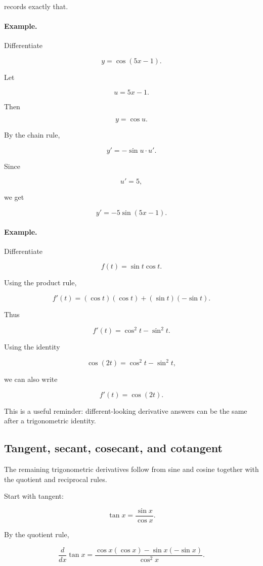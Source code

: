 records exactly that.

\paragraph{Example.}
Differentiate

\[
y=\cos(5x-1).
\]

Let

\[
u=5x-1.
\]

Then

\[
y=\cos u.
\]

By the chain rule,

\[
y'=-\sin u\cdot u'.
\]

Since

\[
u'=5,
\]

we get

\[
\boxed{
y'=-5\sin(5x-1).
}
\]

\paragraph{Example.}
Differentiate

\[
f(t)=\sin t\cos t.
\]

Using the product rule,

\[
f'(t)
=
(\cos t)(\cos t)+(\sin t)(-\sin t).
\]

Thus

\[
f'(t)=\cos^2 t-\sin^2 t.
\]

Using the identity

\[
\cos(2t)=\cos^2t-\sin^2t,
\]

we can also write

\[
\boxed{
f'(t)=\cos(2t).
}
\]

This is a useful reminder: different-looking derivative answers can be the same after a trigonometric identity.

\subsection{Tangent, secant, cosecant, and cotangent}
\label{subsec:other-trig-derivatives}

The remaining trigonometric derivatives follow from sine and cosine together with the quotient and reciprocal rules.

Start with tangent:

\[
\tan x=\frac{\sin x}{\cos x}.
\]

By the quotient rule,

\[
\frac{d}{dx}\tan x
=
\frac{\cos x(\cos x)-\sin x(-\sin x)}{\cos^2x}.
\]

